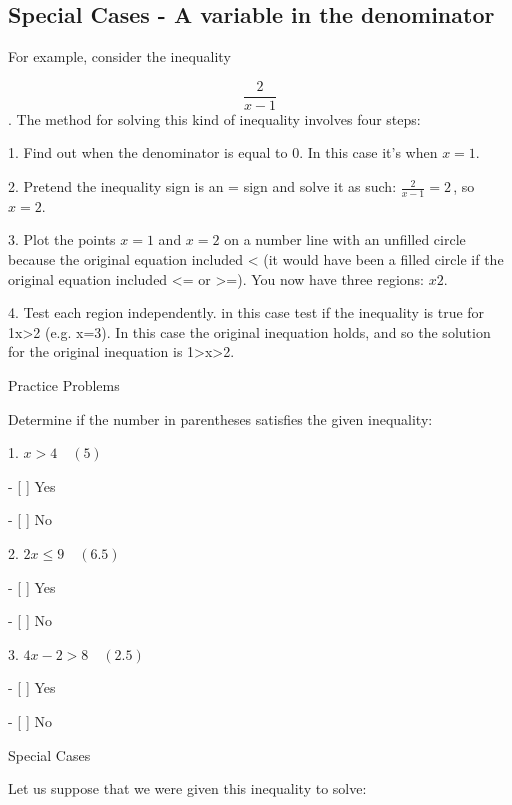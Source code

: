 \subsection{Special Cases - A variable in the denominator}
\label{sss:spec-fcb6}




For example, consider the inequality



$$\frac{2}{x-1}$$. The method for solving this kind of inequality involves four steps:



1.  Find out when the denominator is equal to 0. In this case it's when $x=1$.

2.  Pretend the inequality sign is an = sign and solve it as such: $\frac{2}{x-1}=2\,$, so $x=2$.

3.  Plot the points $x=1$ and $x=2$ on a number line with an unfilled circle because the
original equation included < (it would have been a filled circle if the original equation
included <= or >=). You now have three regions: $x2$.

4.  Test each region independently. in this case test if the inequality is true for 1x>2
(e.g. x=3). In this case the original inequation holds, and so the solution for the
original inequation is 1>x>2.



Practice Problems



Determine if the number in parentheses satisfies the given inequality:



1. $x > 4 \quad (5)$

 - [ ] Yes

 - [ ] No



2. $2x \leq 9 \quad (6.5)$

 - [ ] Yes

 - [ ] No



3. $4x - 2 > 8 \quad (2.5)$

 - [ ] Yes

 - [ ] No



Special Cases



Let us suppose that we were given this inequality to solve:



